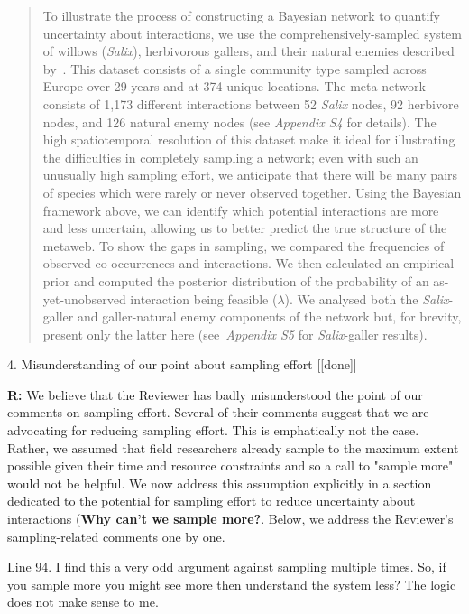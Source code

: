 \documentclass[12pt]{letter}
\newenvironment{refquote}{\bigskip \begin{it}}{\end{it}\smallskip}
\begin{document}
\begin{itemize}
		\begin{quotation}

 			To illustrate the process of constructing a Bayesian network to quantify uncertainty about interactions, we use the comprehensively-sampled system of willows (\emph{Salix}), herbivorous gallers, and their natural enemies described by~\citet{Kopelke2017}. This dataset consists of a single community type sampled across Europe over 29 years and at 374 unique locations. The meta-network consists of 1,173 different interactions between 52 \emph{Salix} nodes, 92 herbivore nodes, and 126 natural enemy nodes (see \emph{Appendix S4} for details). 
      The high spatiotemporal resolution of this dataset make it ideal for illustrating the difficulties in completely sampling a network; even with such an unusually high sampling effort, we anticipate that there will be many pairs of species which were rarely or never observed together. Using the Bayesian framework above, we can identify which potential interactions are more and less uncertain, allowing us to better predict the true structure of the metaweb. To show the gaps in sampling, we compared the frequencies of observed co-occurrences and interactions. We then calculated an empirical prior and computed the posterior distribution of the probability of an as-yet-unobserved interaction being feasible ($\lambda$).
      We analysed both the \emph{Salix}-galler and galler-natural enemy components of the network but, for brevity, present only the latter here (see~\emph{Appendix S5} for \emph{Salix}-galler results).

		\end{quotation}


	4. Misunderstanding of our point about sampling effort [[done]]

		\textbf{R:} We believe that the Reviewer has badly misunderstood the point of our comments on sampling effort. Several of their comments suggest that we are advocating for reducing sampling effort. This is emphatically not the case. Rather, we assumed that field researchers already sample to the maximum extent possible given their time and resource constraints and so a call to "sample more" would not be helpful. We now address this assumption explicitly in a section dedicated to the potential for sampling effort to reduce uncertainty about interactions (\textbf{Why can't we sample more?}. Below, we address the Reviewer's sampling-related comments one by one.


		\begin{refquote}
		Line 94.  I find this a very odd argument against sampling multiple times.  So, if you sample more you might see more then understand the system less?  The logic does not make sense to me. 
		\end{refquote}


\end{itemize}
\end{document}
